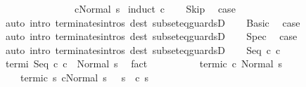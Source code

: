 \begin{isabellebody}
\ \ \ \ \ \ \ \ \ \ \ \ \ \ {\isasymLongrightarrow}\ {\isasymGamma}{\isasymturnstile}c{\isasymdown}Normal\ s{\isachardoublequoteclose}\isanewline
%
\isadelimproof
%
\endisadelimproof
%
\isatagproof
{}\isamarkupfalse%
\ {\isacharparenleft}induct\ c{\isacharprime}{\isacharparenright}\isanewline
\ \ \isamarkupfalse%
\ Skip\ \isamarkupfalse%
\ {\isacharquery}case\ \isamarkupfalse%
\ {\isacharparenleft}auto\ intro{\isacharcolon}\ terminates{\isachardot}intros\ dest{\isacharcolon}\ subseteq{\isacharunderscore}guardsD{\isacharparenright}\isanewline
{}\isamarkupfalse%
\isanewline
\ \ \isamarkupfalse%
\ Basic\ \isamarkupfalse%
\ {\isacharquery}case\ \isamarkupfalse%
\ {\isacharparenleft}auto\ intro{\isacharcolon}\ terminates{\isachardot}intros\ dest{\isacharcolon}\ subseteq{\isacharunderscore}guardsD{\isacharparenright}\isanewline
{}\isamarkupfalse%
\isanewline
\ \ \isamarkupfalse%
\ Spec\ \isamarkupfalse%
\ {\isacharquery}case\ \isamarkupfalse%
\ {\isacharparenleft}auto\ intro{\isacharcolon}\ terminates{\isachardot}intros\ dest{\isacharcolon}\ subseteq{\isacharunderscore}guardsD{\isacharparenright}\isanewline
{}\isamarkupfalse%
\isanewline
\ \ \isamarkupfalse%
\ {\isacharparenleft}Seq\ c{}{\isacharprime}\ c{}{\isacharprime}{\isacharparenright}\isanewline
\ \ \isamarkupfalse%
\ termi{\isacharcolon}\ {\isachardoublequoteopen}{\isasymGamma}{\isasymturnstile}Seq\ c{}{\isacharprime}\ c{}{\isacharprime}\ {\isasymdown}\ Normal\ s{\isachardoublequoteclose}\ \isamarkupfalse%
\ fact\isanewline
\ \ \isamarkupfalse%
\ \isamarkupfalse%
\ \isanewline
\ \ \ \ termi{\isacharunderscore}c{}{\isacharprime}{\isacharcolon}\ {\isachardoublequoteopen}{\isasymGamma}{\isasymturnstile}c{}{\isacharprime}{\isasymdown}\ Normal\ s{\isachardoublequoteclose}\ \isanewline
\ \ \ \ termi{\isacharunderscore}c{}{\isacharprime}{\isacharcolon}\ {\isachardoublequoteopen}{\isasymforall}s{\isacharprime}{\isachardot}\ {\isasymGamma}{\isasymturnstile}{\isasymlangle}c{}{\isacharprime}{\isacharcomma}Normal\ s\ {\isasymrangle}\ {\isasymRightarrow}\ s{\isacharprime}\ {\isasymlongrightarrow}\ {\isasymGamma}{\isasymturnstile}c{}{\isacharprime}{\isasymdown}\ s{\isacharprime}{\isachardoublequoteclose}\isanewline

\end{isabellebody}
